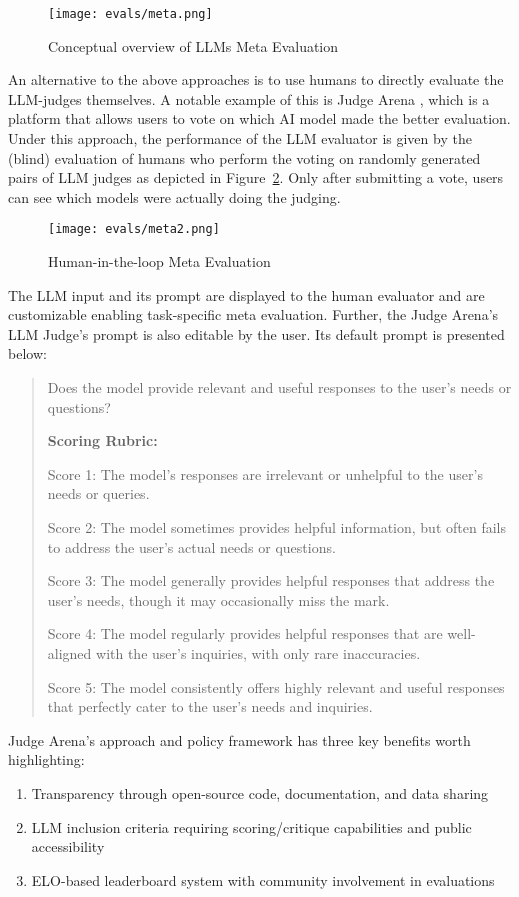 \begin{figure}[h]
\centering
\texttt{[image: evals/meta.png]}
\caption{Conceptual overview of LLMs Meta Evaluation}
\label{fig:meta}
\end{figure}
An alternative to the above approaches is to use humans to directly evaluate the LLM-judges themselves. A notable example of this is Judge Arena , which is a platform that allows users to vote on which AI model made the better evaluation. Under this approach, the performance of the LLM evaluator is given by the (blind) evaluation of humans who perform the voting on randomly generated pairs of LLM judges as depicted in Figure~\ref{fig:meta2}. Only after submitting a vote, users can see which models were actually doing the judging.

\begin{figure}[h]
\centering
\texttt{[image: evals/meta2.png]}
\caption{Human-in-the-loop Meta Evaluation}
\label{fig:meta2}
\end{figure}

The LLM input and its prompt are displayed to the human evaluator and are customizable enabling task-specific meta evaluation. Further, the Judge Arena's LLM Judge's prompt is also editable by the user. Its default prompt is presented below:
\begin{quote}
Does the model provide relevant and useful responses to the user's needs or questions?

\textbf{Scoring Rubric:}

Score 1: The model's responses are irrelevant or unhelpful to the user's needs or queries.

Score 2: The model sometimes provides helpful information, but often fails to address the user's actual needs or questions.

Score 3: The model generally provides helpful responses that address the user's needs, though it may occasionally miss the mark.

Score 4: The model regularly provides helpful responses that are well-aligned with the user's inquiries, with only rare inaccuracies.

Score 5: The model consistently offers highly relevant and useful responses that perfectly cater to the user's needs and inquiries.
\end{quote}

Judge Arena's approach and policy framework has three key benefits worth highlighting:
\begin{enumerate}
    \item Transparency through open-source code, documentation, and data sharing
    \item LLM inclusion criteria requiring scoring/critique capabilities and public accessibility
    \item ELO-based leaderboard system with community involvement in evaluations
\end{enumerate}


